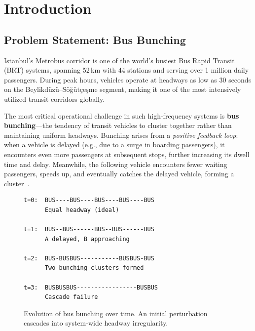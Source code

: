 
\section{Introduction}
\label{sec:introduction}

\subsection{Problem Statement: Bus Bunching}

Istanbul's Metrobus corridor is one of the world's busiest Bus Rapid Transit (BRT) systems, spanning 52\,km with 44 stations and serving over 1 million daily passengers. During peak hours, vehicles operate at headways as low as 30 seconds on the Beylikd\"uz\"u--S\"o\u{g}\"ut\c{c}e\c{s}me segment, making it one of the most intensively utilized transit corridors globally.

The most critical operational challenge in such high-frequency systems is \textbf{bus bunching}---the tendency of transit vehicles to cluster together rather than maintaining uniform headways. Bunching arises from a \textit{positive feedback loop}: when a vehicle is delayed (e.g., due to a surge in boarding passengers), it encounters even more passengers at subsequent stops, further increasing its dwell time and delay. Meanwhile, the following vehicle encounters fewer waiting passengers, speeds up, and eventually catches the delayed vehicle, forming a cluster~\cite{daganzo2009headway}.

\begin{figure}[h]
\centering
\begin{verbatim}
t=0:  BUS----BUS----BUS----BUS----BUS
      Equal headway (ideal)

t=1:  BUS--BUS------BUS--BUS------BUS
      A delayed, B approaching

t=2:  BUS-BUSBUS-----------BUSBUS-BUS
      Two bunching clusters formed

t=3:  BUSBUSBUS-----------------BUSBUS
      Cascade failure
\end{verbatim}
\caption{Evolution of bus bunching over time. An initial perturbation cascades into system-wide headway irregularity.}
\label{fig:bunching_evolution}
\end{figure}

